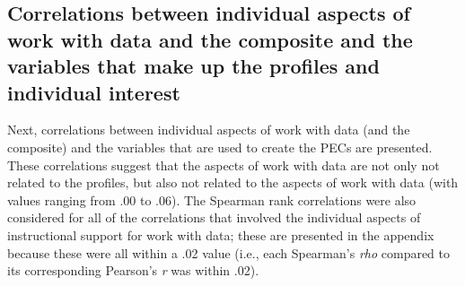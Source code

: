 \documentclass[]{msu-thesis}
\theoremstyle{definition}
\theoremstyle{definition}
\theoremstyle{definition}
\theoremstyle{remark}
\begin{document}
\subsection{Correlations between individual aspects of work with data
and the composite and the variables that make up the profiles and
individual
interest}\label{correlations-between-individual-aspects-of-work-with-data-and-the-composite-and-the-variables-that-make-up-the-profiles-and-individual-interest}

Next, correlations between individual aspects of work with data (and the
composite) and the variables that are used to create the PECs are
presented. These correlations suggest that the aspects of work with data
are not only not related to the profiles, but also not related to the
aspects of work with data (with values ranging from .00 to .06). The
Spearman rank correlations were also considered for all of the
correlations that involved the individual aspects of instructional
support for work with data; these are presented in the appendix because
these were all within a .02 value (i.e., each Spearman's \emph{rho}
compared to its corresponding Pearson's \emph{r} was within .02).

\begin{landscape}\begin{table}[H]
\centering
{}
\end{table}
\end{landscape}
\end{document}
